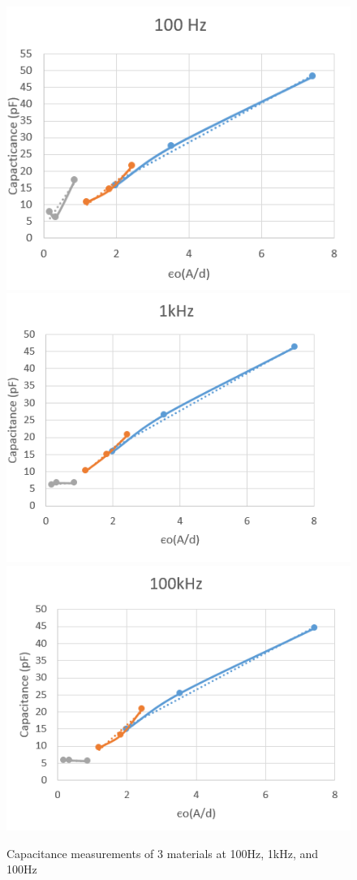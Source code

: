 \documentclass{article}
\begin{document}
\begin{figure}[h!]
	\centering
	\includegraphics[scale=0.9]{100.png}\\
	\includegraphics[scale=0.92]{1k.png}\\
	\includegraphics[scale=0.87]{100k.png}
	\caption{Capacitance measurements of 3 materials at 100Hz, 1kHz, and 100Hz}
\end{figure}
\end{document}
